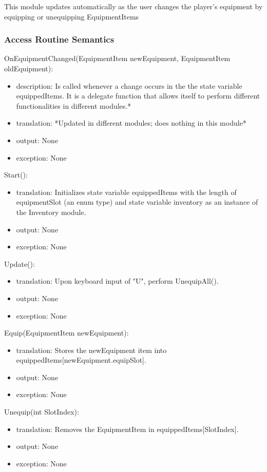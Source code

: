 \documentclass[12pt]{article}
\begin{document}
This module updates automatically as the user changes the player's equipment by equipping or unequipping EquipmentItems

\subsubsection* {Access Routine Semantics}

\noindent OnEquipmentChanged(EquipmentItem newEquipment, EquipmentItem oldEquipment):
\begin{itemize}
\item description: Is called whenever a change occurs in the the state variable equippedItems. It is a delegate function that allows itself to perform different functionalities in different modules.*
\item translation: *Updated in different modules; does nothing in this module*
\item output: None
\item exception: None
\end{itemize}

\noindent Start():
\begin{itemize}
\item translation: Initializes state variable equippedItems with the length of equipmentSlot (an enum type) and state variable inventory as an instance of the Inventory module.
\item output: None
\item exception: None
\end{itemize}

\noindent Update():
\begin{itemize}
\item translation: Upon keyboard input of "U", perform UnequipAll().
\item output: None
\item exception: None
\end{itemize}

\noindent Equip(EquipmentItem newEquipment):
\begin{itemize}
\item translation: Stores the newEquipment item into equippedItems[newEquipment.equipSlot].
\item output: None
\item exception: None
\end{itemize}

\noindent Unequip(int SlotIndex):
\begin{itemize}
\item translation: Removes the EquipmentItem in equippedItems[SlotIndex].
\item output: None
\item exception: None
\end{itemize}
\end{document}
